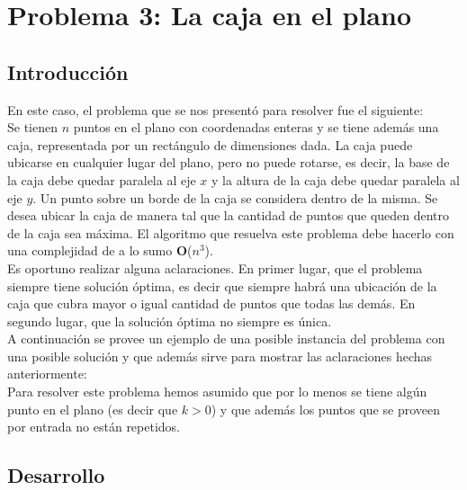 \section{Problema 3: La caja en el plano}

\subsection{Introducci\'on}

\indent En este caso, el problema que se nos presentó para resolver fue el siguiente:\\
\indent Se tienen $n$ puntos en el plano con coordenadas enteras y se tiene adem\'as una caja, representada por un rect\'angulo de dimensiones dada. La caja puede ubicarse en cualquier lugar del plano, pero no puede rotarse, es decir, la base de la caja debe quedar paralela al eje $x$ y la altura de la caja debe quedar paralela al eje $y$. Un punto sobre un borde de la caja se considera dentro de la misma. Se desea ubicar la caja de manera tal que la cantidad de puntos que queden dentro de la caja sea m\'axima. El algoritmo que resuelva este problema debe hacerlo con una complejidad de a lo sumo \textbf{O}($n^{3}$).\\
\indent Es oportuno realizar alguna aclaraciones. En primer lugar, que el problema siempre tiene soluci\'on \'optima, es decir que siempre habr\'a una ubicaci\'on de la caja que cubra mayor o igual cantidad de puntos que todas las dem\'as. En segundo lugar, que la soluci\'on \'optima no siempre es \'unica. \\
\indent A continuaci\'on se provee un ejemplo de una posible instancia del problema con una posible soluci\'on y que adem\'as sirve para mostrar las aclaraciones hechas anteriormente:\\




\indent Para resolver este problema hemos asumido que por lo menos se tiene alg\'un punto en el plano (es decir que $k>0$) y que adem\'as los puntos que se proveen por entrada no est\'an repetidos.\\

\subsection{Desarrollo}


